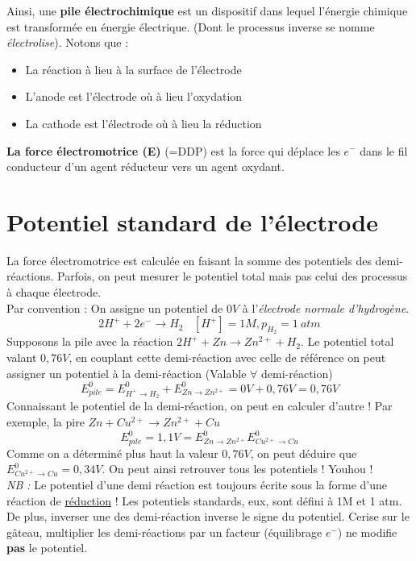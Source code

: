 \documentclass[british,french,11pt, a4paper, openany]{book}
\begin{document}
Ainsi, une \textbf{pile électrochimique} est un dispositif dans lequel l'énergie chimique est transformée en énergie électrique. (Dont le processus inverse se nomme \textit{électrolise}). Notons que :
\begin{itemize}
	\item La réaction à lieu à la surface de l'électrode
	\item L'anode est l'électrode où à lieu l'oxydation
	\item La cathode est l'électrode où à lieu la réduction
\end{itemize}
\textbf{La force électromotrice (E)} (=DDP) est la force qui déplace les $e^-$ dans le fil conducteur d'un agent réducteur vers un agent oxydant. 

\section{Potentiel standard de l'électrode}
La force électromotrice est calculée en faisant la somme des potentiels des demi-réactions. Parfois, on peut mesurer le potentiel total mais pas celui des processus à chaque électrode.\\
Par convention  : On assigne un potentiel de $0 V$ à l'\textit{électrode normale d'hydrogène}.
$$2H^+ + 2e^- \rightarrow H_2\ \ \ \ [H^+] = 1M, p_{H_2} = 1\ atm$$
Supposons la pile avec la réaction $2H^+ + Zn \rightarrow Zn^{2+} + H_2$. Le potentiel total valant $0,76V$, en couplant cette demi-réaction avec celle de référence on peut assigner un potentiel à la demi-réaction (Valable $\forall$ demi-réaction)
$$E^0_{pile} = E^0_{H^+ \rightarrow H_2} + E^0_{Zn \rightarrow Zn^{2+}} = 0V + 0,76V = 0,76V$$
Connaissant le potentiel de la demi-réaction, on peut en calculer d'autre ! Par exemple, la pire $Zn + Cu^{2+} \rightarrow Zn^{2+} + Cu$
$$E^0_{pile} = 1,1V = E^0_{Zn \rightarrow Zn^{2+}}  E^0_{Cu^{2+} \rightarrow Cu}$$
Comme on a déterminé plus haut la valeur $0,76V$, on peut déduire que $E^0_{Cu^{2+} \rightarrow Cu} = 0,34V$. On peut ainsi retrouver tous les potentiels ! Youhou !\\

\textit{NB :} Le potentiel d'une demi réaction est toujours écrite sous la forme d'une réaction de \underline{réduction} ! Les potentiels standards, eux, sont défini à 1M et 1 atm. \\

De plus, inverser une des demi-réaction inverse le signe du potentiel. Cerise sur le gâteau, multiplier les demi-réactions par un facteur (équilibrage $e^-$) ne modifie \textbf{pas} le potentiel.
\end{document}
